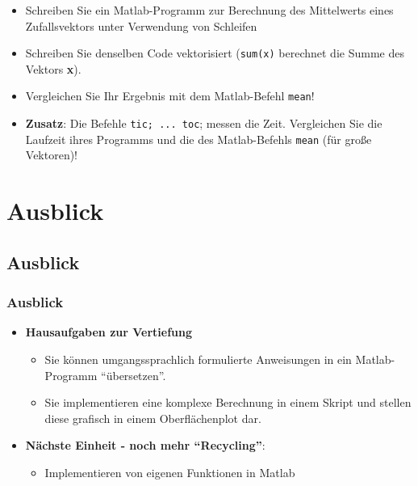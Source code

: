       \secMexercise
      \begin{frame}
          \frameMexercise
          \begin{exercise}
              \sloppy
              \begin{itemize}
                \item Schreiben Sie ein Matlab-Programm zur Berechnung des Mittelwerts eines Zufallsvektors unter Verwendung von Schleifen
                \item Schreiben Sie denselben Code vektorisiert (\texttt{sum(x)} berechnet die Summe des Vektors \textbf{x}).
                \item Vergleichen Sie Ihr Ergebnis mit dem Matlab-Befehl \texttt{mean}!
                \item \textbf{Zusatz}: Die Befehle \texttt{tic; ... toc}; messen die Zeit. Vergleichen Sie die Laufzeit ihres Programms und die des
                Matlab-Befehls \texttt{mean} (für große Vektoren)!
              \end{itemize}
          \end{exercise}
      \end{frame}

  \section{Ausblick}

      \subsection{Ausblick}
      \begin{frame}
          \frametitle{Ausblick}
          \begin{itemize}
            \item \textbf{Hausaufgaben zur Vertiefung}
            \begin{itemize}
              \item Sie können umgangssprachlich formulierte Anweisungen in ein Matlab-Programm ``übersetzen''.
              \item Sie implementieren eine komplexe Berechnung in einem Skript und stellen diese grafisch in einem Oberflächenplot dar.
            \end{itemize}
            \item \textbf{Nächste Einheit - noch mehr ``Recycling''}:
            \begin{itemize}
              \item Implementieren von eigenen Funktionen in Matlab
            \end{itemize}
          \end{itemize}
      \end{frame}



